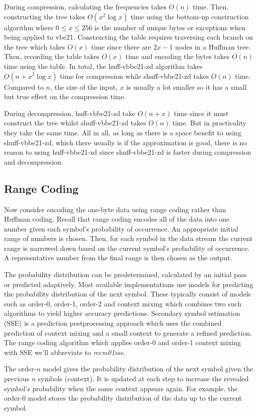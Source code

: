 During compression, calculating the frequencies takes $O(n)$ time. Then,
constructing the tree takes $O(x^2\log x)$ time using the bottom-up construction
algorithm where $0\le x \le 256$ is the number of unique bytes or exceptions
when being applied to vbe21. Constructing the table requires traversing each
branch on the tree which takes $O(x)$ time since there are $2x-1$ nodes in a
Huffman tree. Then, recording the table takes $O(x)$ time and encoding the bytes
takes $O(n)$ time using the table. In total, the huff-vbbe21-zd algorithm takes
$O(n + x^2\log x)$ time for compression while shuff-vbbe21-zd takes $O(n)$ time. Compared
to $n$, the size of the input, $x$ is usually a lot smaller so it has a small
but true effect on the compression time.

During decompression, huff-vbbe21-zd take $O(n + x)$ time since it must construct the tree
whilst shuff-vbbe21-zd takes $O(n)$ time. But in practicality they take the same time. All
in all, as long as there is a space benefit to using shuff-vbbe21-zd, which there usually
is if the approximation is good, there is no reason to using huff-vbbe21-zd since shuff-vbbe21-zd is
faster during compression and decompression.



\subsection{Range Coding}

Now consider encoding the one-byte data using range coding rather than Huffman
coding. Recall that range coding encodes all of the data into one number given
each symbol's probability of occurrence.  An appropriate initial range of
numbers is chosen. Then, for each symbol in the data stream the current range is
narrowed down based on the current symbol's probability of occurrence. A
representative number from the final range is then chosen as the output.

The probability distribution can be predetermined, calculated by an initial pass
or predicted adaptively. Most available implementations use models
for predicting the probability distribution of the next symbol. These typically
consist of models such as order-0, order-1, order-2 and context mixing which combines
two such algorithms to yield higher accuracy predictions. Secondary symbol
estimation (SSE) is a prediction postprocessing approach which uses the combined
prediction of context mixing and a small context to generate a refined
prediction. The range coding algorithm which applies order-0 and order-1 context
mixing with SSE we'll abbreviate to \textit{rccm01sse}.

The order-$n$ model gives the probability distribution of the next symbol given
the previous $n$ symbols (context). It is updated at each step to increase the
revealed symbol's probability when the same context appears again. For example,
the order-0 model stores the probability distribution of the data up to the
current symbol.

